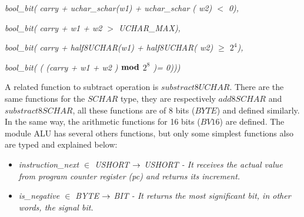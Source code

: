 \documentclass[11pt]{article} %
\begin{document}
\hspace*{0.40in}\it bool\_bit\rm ( \it carry \rm + \it uchar\_schar\rm (\it w1\rm ) \rm + \it uchar\_schar \rm (\it
w2\rm ) $<$ \rm 0\rm ),

\hspace*{0.40in}\it bool\_bit\rm ( \it carry \rm + \it w1 \rm + \it w2 $>$ \it UCHAR\_MAX\rm )\rm ,

\hspace*{0.40in}\it bool\_bit\rm ( \it carry \rm + \it half8UCHAR\rm (\it w1\rm ) \rm + \it half8UCHAR\rm ( \it
w2\rm )  $\geq$  \it $2^{4}$\rm )\rm,

\hspace*{0.40in}\it bool\_bit\rm ( \rm ( \rm (\it carry \rm + \it w1 \rm + \it w2 \rm )  $\mod$  \it $2^{8}$ \rm
)\rm = \rm 0\rm )\rm )\hspace*{0.10in}\rm )

\hspace*{0.20in}

A related function to subtract operation is $\mathit{substract8UCHAR}$. There are the same functions for the
$\mathit{SCHAR}$ type, they are respectively $\mathit{add8SCHAR}$ and $\mathit{substract8SCHAR}$, all these
functions are of 8 bits ($\mathit{BYTE}$) and defined similarly. In the same way, the arithmetic functions for 16
bits ($\mathit{BV16}$) are defined.
The module ALU has several others functions, but only some simplest functions also are typed and explained below:

\begin{itemize}

  \item \it instruction\_next  $\in$  USHORT  $\fun$  USHORT \rm - It receives the  
  actual value from program counter register (\textit{pc}) and returns its increment.
 \item \it is\_negative  $\in$  \it BYTE  $\fun$  \it BIT \rm - It returns the most significant bit,
 in other words, the signal bit.

  


\end{itemize}
\end{document}

